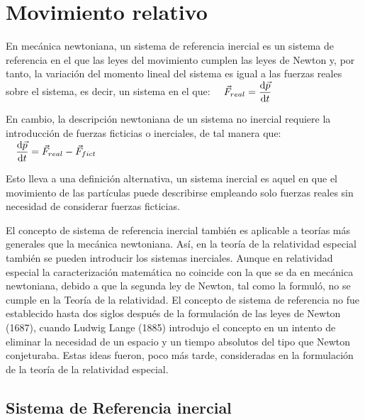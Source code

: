 \chapter{Movimiento relativo}

\vspace{15mm} %
\begin{miparrafo}

En mecánica newtoniana, un sistema de referencia inercial es un sistema de referencia en el que las leyes del movimiento cumplen las leyes de Newton y, por tanto, la variación del momento lineal del sistema es igual a las fuerzas reales sobre el sistema, es decir, un sistema en el que:
$\quad \vec F_{real} = \displaystyle \dv{\vec p}{t}$


\vspace{2mm} En cambio, la descripción newtoniana de un sistema no inercial requiere la introducción de fuerzas ficticias o inerciales, de tal manera que:
$\quad \displaystyle \dv{\vec p}{t}=\vec {F} _{real}-\vec {F}_{fict}$

\vspace{2mm} Esto lleva a una definición alternativa, un sistema inercial es aquel en que el movimiento de las partículas puede describirse empleando solo fuerzas reales sin necesidad de considerar fuerzas ficticias.

\vspace{2mm} El concepto de sistema de referencia inercial también es aplicable a teorías más generales que la mecánica newtoniana. Así, en la teoría de la relatividad especial también se pueden introducir los sistemas inerciales. Aunque en relatividad especial la caracterización matemática no coincide con la que se da en mecánica newtoniana, debido a que la segunda ley de Newton, tal como la formuló, no se cumple en la Teoría de la relatividad. El concepto de sistema de referencia no fue establecido hasta dos siglos después de la formulación de las leyes de Newton (1687), cuando Ludwig Lange (1885) introdujo el concepto en un intento de eliminar la necesidad de un espacio y un tiempo absolutos del tipo que Newton conjeturaba. Estas ideas fueron, poco más tarde, consideradas en la formulación de la teoría de la relatividad especial.
	
\end{miparrafo}

\vspace{35mm} %

\section{Sistema de Referencia inercial}

